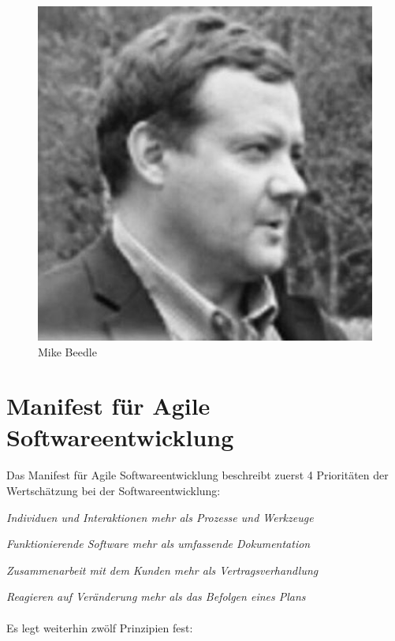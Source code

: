\documentclass{article}
\begin{document}
\begin{figure}[h]
  \centering
  \includegraphics[scale=.85]{img/mike.png}
  \caption{Mike Beedle}
  \label{mikepng}
\end{figure}

\pagebreak

\section{Manifest für Agile Softwareentwicklung}
\paragraph{}
Das Manifest für Agile Softwareentwicklung beschreibt zuerst 4 Prioritäten der Wertschätzung bei der Softwareentwicklung:
\vspace{10px}

{
\centering
\textit{Individuen und Interaktionen mehr als Prozesse und Werkzeuge}

\textit{Funktionierende Software mehr als umfassende Dokumentation}

\textit{Zusammenarbeit mit dem Kunden mehr als Vertragsverhandlung}

\textit{Reagieren auf Veränderung mehr als das Befolgen eines Plans}

}
\paragraph{}
Es legt weiterhin zwölf Prinzipien fest:
\end{document}
